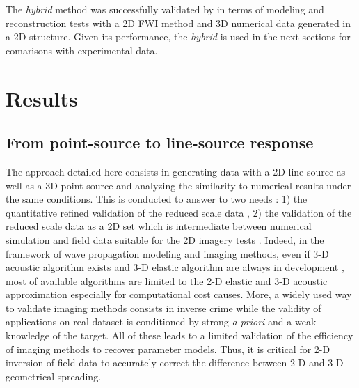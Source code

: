 \documentclass[manuscript,revised]{geophysics}
\newcommand{\twod}{2-D }
\newcommand{\thrd}{3-D }
\begin{document}
\noindent The \textit{hybrid} method was successfully validated by \citet{Schafer_LSS_2014} in terms of modeling and reconstruction tests with a 2D FWI method and 3D numerical data generated in a 2D structure. Given its performance, the \textit{hybrid} is used in the next sections for comarisons with experimental data. 

\section{Results}

\subsection{From point-source to line-source response}

\noindent The approach detailed here consists in generating data with a 2D line-source as well as a 3D point-source and analyzing the similarity to numerical results under the same conditions. This is conducted to answer to two needs : 1) the quantitative refined validation of the reduced scale data , 2) the validation of the reduced scale data as a 2D set which is intermediate between numerical simulation and field data suitable for the 2D imagery tests . Indeed, in the framework of wave propagation modeling and imaging methods, even if \thrd acoustic algorithm exists \citep{benhadjali_FWI_2008,plessix_FWI_2010} and \thrd elastic algorithm are always in development \citep{castellanos_AMD_2011,Borisov_FWI_2015}, most of available algorithms are limited to the \twod elastic and \thrd acoustic approximation especially for computational cost causes. More, a widely used way to validate imaging methods consists in inverse crime while the validity of applications on real dataset is conditioned by strong \textit{a priori} and a weak knowledge of the target. All of these leads to a limited validation of the efficiency of imaging methods to recover parameter models. Thus, it is critical for \twod inversion of field data to accurately correct the difference between \twod and \thrd geometrical spreading.

\end{document}
